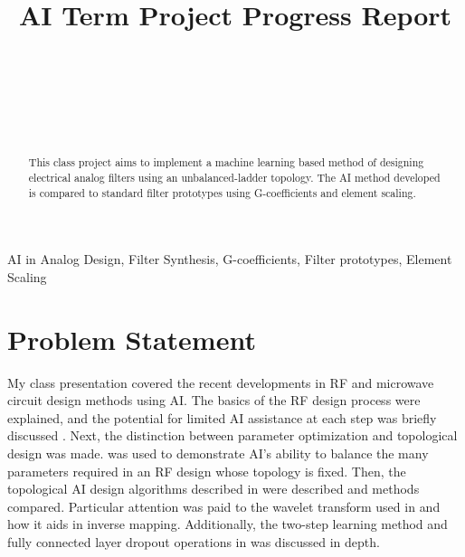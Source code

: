 \documentclass[10pt,conference]{IEEEtran}
\begin{document}
\title{AI Term Project Progress Report\\
 \Large{} }

\author{
\\
\and
\IEEEauthorblockN{---, ---,}
\IEEEauthorblockA{--\\
---\\
---\\
---}\\ }
\vspace{-1in}

\maketitle



\begin{abstract}
This class project aims to implement a machine learning based method of designing electrical analog filters using an unbalanced-ladder topology. The AI method developed is compared to standard filter prototypes using G-coefficients and element scaling.




\end{abstract}
\renewcommand\IEEEkeywordsname{Keywords}
\begin{IEEEkeywords}
AI in Analog Design, Filter Synthesis, G-coefficients, Filter prototypes, Element Scaling
\end{IEEEkeywords}



\section{Problem Statement}

My class presentation covered the recent developments in RF and microwave circuit design methods using AI. The basics of the RF design process were explained, and the potential for limited AI assistance at each step was briefly discussed \cite{lee2024icdesign}. Next, the distinction between parameter optimization and topological design was made. \cite{xue2023mmic} was used to demonstrate AI's ability to balance the many parameters required in an RF design whose topology is fixed. Then, the topological AI design algorithms described in \cite{xu2024microwave, karahan2024rfdesign, taskiran2024annsynthesis} were described and methods compared. Particular attention was paid to the wavelet transform used in \cite{xu2024microwave} and how it aids in inverse mapping. Additionally, the two-step learning method and fully connected layer dropout operations in \cite{karahan2024rfdesign} was discussed in depth.
\end{document}
